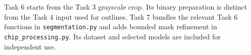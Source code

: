 \documentclass[11pt,a4paper]{article}
\begin{document}
Task 6 starts from the Task 3 grayscale crop. Its binary preparation is distinct from the Task 4 input used for outlines. Task 7 bundles the relevant Task 6 functions in \texttt{segmentation.py} and adds bounded mask refinement in \texttt{chip\_processing.py}. Its dataset and selected models are included for independent use.





\appendix
\clearpage

\end{document}
